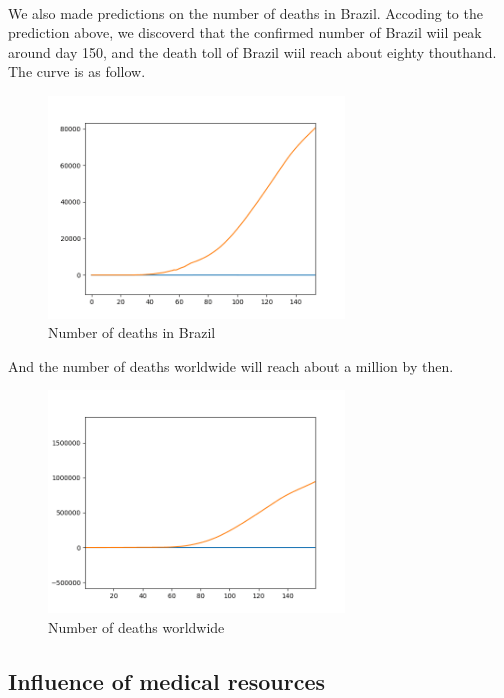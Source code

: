 \documentclass[]{article}
\begin{document}
\paragraph{}
We also made predictions on the number of deaths in Brazil. Accoding to the prediction above, we discoverd that the confirmed number of
Brazil wiil peak around day 150, and the death toll of Brazil wiil reach about eighty thouthand. The curve is as follow. 
\begin{figure}[H]
	\centering
	\includegraphics[width=0.7\textwidth]{Death_Brazil.png}
	\caption{Number of deaths in Brazil}
\end{figure}
And the number of deaths worldwide will reach about a million by then.
\begin{figure}[H]
	\centering
	\includegraphics[width=0.7\textwidth]{Death_Worldwide.png}
	\caption{Number of deaths worldwide}
\end{figure}
\subsection{Influence of medical resources}
\end{document}
